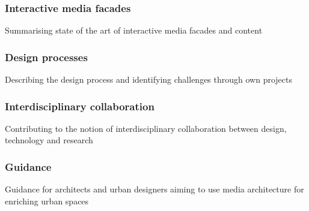 \subsubsection*{Interactive media facades} Summarising state of the art of interactive media facades and content
\subsubsection*{Design processes} Describing the design process and identifying challenges through own projects 
\subsubsection*{Interdisciplinary collaboration} Contributing to the notion of interdisciplinary collaboration between design, technology and research 
\subsubsection*{Guidance} Guidance for architects and urban designers aiming to use media architecture for enriching urban spaces




